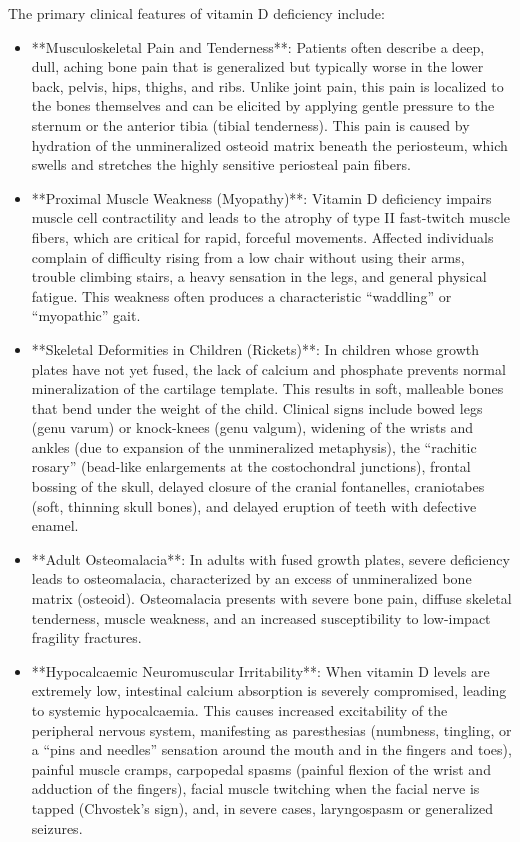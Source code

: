 The primary clinical features of vitamin D deficiency include:
\begin{itemize}
    \item **Musculoskeletal Pain and Tenderness**: Patients often describe a deep, dull, aching bone pain that is generalized but typically worse in the lower back, pelvis, hips, thighs, and ribs. Unlike joint pain, this pain is localized to the bones themselves and can be elicited by applying gentle pressure to the sternum or the anterior tibia (tibial tenderness). This pain is caused by hydration of the unmineralized osteoid matrix beneath the periosteum, which swells and stretches the highly sensitive periosteal pain fibers.
    \item **Proximal Muscle Weakness (Myopathy)**: Vitamin D deficiency impairs muscle cell contractility and leads to the atrophy of type II fast-twitch muscle fibers, which are critical for rapid, forceful movements. Affected individuals complain of difficulty rising from a low chair without using their arms, trouble climbing stairs, a heavy sensation in the legs, and general physical fatigue. This weakness often produces a characteristic ``waddling'' or ``myopathic'' gait.
    \item **Skeletal Deformities in Children (Rickets)**: In children whose growth plates have not yet fused, the lack of calcium and phosphate prevents normal mineralization of the cartilage template. This results in soft, malleable bones that bend under the weight of the child. Clinical signs include bowed legs (genu varum) or knock-knees (genu valgum), widening of the wrists and ankles (due to expansion of the unmineralized metaphysis), the ``rachitic rosary'' (bead-like enlargements at the costochondral junctions), frontal bossing of the skull, delayed closure of the cranial fontanelles, craniotabes (soft, thinning skull bones), and delayed eruption of teeth with defective enamel.
    \item **Adult Osteomalacia**: In adults with fused growth plates, severe deficiency leads to osteomalacia, characterized by an excess of unmineralized bone matrix (osteoid). Osteomalacia presents with severe bone pain, diffuse skeletal tenderness, muscle weakness, and an increased susceptibility to low-impact fragility fractures.
    \item **Hypocalcaemic Neuromuscular Irritability**: When vitamin D levels are extremely low, intestinal calcium absorption is severely compromised, leading to systemic hypocalcaemia. This causes increased excitability of the peripheral nervous system, manifesting as paresthesias (numbness, tingling, or a ``pins and needles'' sensation around the mouth and in the fingers and toes), painful muscle cramps, carpopedal spasms (painful flexion of the wrist and adduction of the fingers), facial muscle twitching when the facial nerve is tapped (Chvostek's sign), and, in severe cases, laryngospasm or generalized seizures.

\end{itemize}
